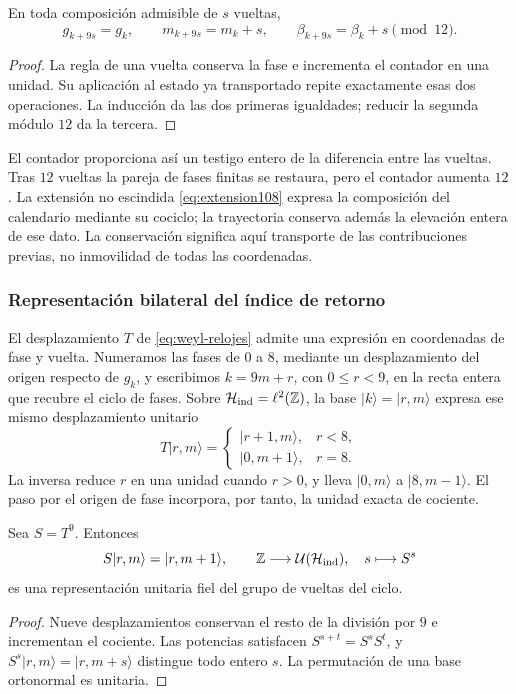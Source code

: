 \begin{proposition}
\label{mono-ampl:vueltas}
En toda composición admisible de \(s\) vueltas,
\[
 g_{k+9s}=g_k,\qquad m_{k+9s}=m_k+s,\qquad
 \beta_{k+9s}=\beta_k+s\pmod{12}.
\]
\end{proposition}
\begin{proof}
La regla de una vuelta conserva la fase e incrementa el contador en una
unidad. Su aplicación al estado ya transportado repite exactamente esas
dos operaciones. La inducción da las dos primeras igualdades; reducir la
segunda módulo \(12\) da la tercera.
\end{proof}

El contador proporciona así un testigo entero de la diferencia entre las
vueltas. Tras \(12\) vueltas la pareja de fases finitas se restaura, pero
el contador aumenta \(12\). La extensión no escindida
\eqref{eq:extension108} expresa la composición del calendario mediante su
cociclo; la trayectoria conserva además la elevación entera de ese dato.
La conservación significa aquí transporte de las contribuciones previas,
no inmovilidad de todas las coordenadas.

\subsubsection{Representación bilateral del índice de retorno}

El desplazamiento \(T\) de \eqref{eq:weyl-relojes} admite una
expresión en coordenadas de fase y vuelta. Numeramos las fases de \(0\) a
\(8\), mediante un desplazamiento del origen respecto de \(g_k\), y
escribimos \(k=9m+r\), con \(0\leq r<9\), en la recta entera
que recubre el ciclo de fases. Sobre
\(\mathcal H_{\rm ind}=\ell^2(\mathbb Z)\), la base
\(|k\rangle=|r,m\rangle\) expresa ese mismo desplazamiento unitario
\[
 T|r,m\rangle=
 \begin{cases}
 |r+1,m\rangle,&r<8,\\
 |0,m+1\rangle,&r=8.
 \end{cases}
\]
La inversa reduce \(r\) en una unidad cuando \(r>0\), y lleva
\(|0,m\rangle\) a \(|8,m-1\rangle\). El paso por el origen de fase
incorpora, por tanto, la unidad exacta de cociente.

\begin{proposition}
\label{mono-ampl:representacion}
Sea \(S=T^9\). Entonces
\[
 S|r,m\rangle=|r,m+1\rangle,\qquad
 \mathbb Z\longrightarrow\mathcal U(\mathcal H_{\rm ind}),
 \quad s\longmapsto S^s
\]
es una representación unitaria fiel del grupo de vueltas del ciclo.
\end{proposition}
\begin{proof}
Nueve desplazamientos conservan el resto de la división por \(9\) e
incrementan el cociente. Las potencias satisfacen
\(S^{s+t}=S^sS^t\), y \(S^s|r,m\rangle=|r,m+s\rangle\) distingue
todo entero \(s\). La permutación de una base ortonormal es unitaria.
\end{proof}

